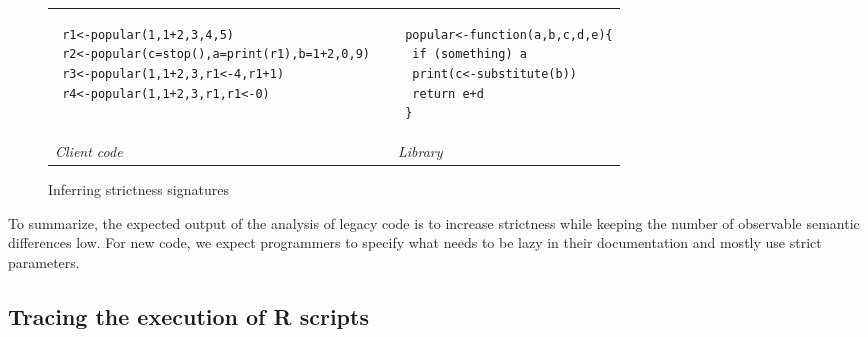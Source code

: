 \documentclass[review,nonacm,screen,acmsmall,anonymous=true]{acmart}
\begin{document}
\begin{figure}[!h]
\begin{tabular}{lll}
  \begin{minipage}{7cm}
\begin{lstlisting}
 r1<-popular(1,1+2,3,4,5)
 r2<-popular(c=stop(),a=print(r1),b=1+2,0,9)
 r3<-popular(1,1+2,3,r1<-4,r1+1)
 r4<-popular(1,1+2,3,r1,r1<-0)
\end{lstlisting}
\end{minipage}
&&
\begin{minipage}{5cm}
\begin{lstlisting}
 popular<-function(a,b,c,d,e){
  if (something) a
  print(c<-substitute(b))
  return e+d
 }
\end{lstlisting}
\end{minipage}\\
\it Client code&& \it Library
\end{tabular}%
\caption{Inferring strictness signatures}\label{iss}
\end{figure}

To summarize, the expected output of the analysis of legacy code is to increase
strictness while keeping the number of observable semantic differences low. For
new code, we expect programmers to specify what needs to be lazy in their
documentation and mostly use strict parameters.

\subsection{Tracing the execution of R scripts}
\end{document}
